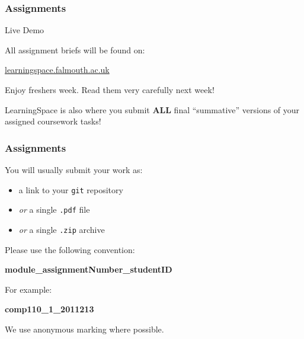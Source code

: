 


\begin{frame}
	\frametitle{Assignments}
	
	Live Demo
	
	\vspace{3em}
	
	All assignment briefs will be found on:
	
	\vspace{0.5em}
	
	\indent \url{learningspace.falmouth.ac.uk}
	
	\vspace{0.5em}
	
	Enjoy freshers week. Read them very carefully next week!
	
	\vspace{0.5em}
	
	LearningSpace is also where you submit \textbf{ALL} final ``summative'' versions of your assigned coursework tasks!
	
\end{frame}

\begin{frame}
	\frametitle{Assignments}
	
	You will usually submit your work as:
	
	\begin{itemize}
	    \item a link to your \texttt{git} repository
	    \item \textit{or} a single \texttt{.pdf} file
	    \item \textit{or} a single \texttt{.zip} archive
	\end{itemize}
	
	\vspace{1em}
	
	 Please use the following convention:
	
	\begin{large}
		\begin{center}
			\textbf{module\_assignmentNumber\_studentID}
		\end{center}
	\end{large}
	
	For example:
	
	\begin{Large}
		\begin{center}
			\textbf{comp110\_1\_2011213}
		\end{center}
	\end{Large}
	
	\vspace{1em}
	
	We use anonymous marking where possible.

\end{frame}

